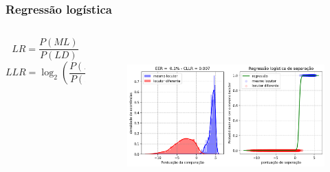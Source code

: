 \documentclass[121pt, aspectratio=169, t]{beamer}
\begin{document}
\begin{frame}[fragile=singleslide]
	\frametitle{Regressão logística}
	\begin{columns}
		\begin{column}{0.25\textwidth}
			\[LR = \frac{P(ML)}{P(LD)} \]
			\[LLR = \log_2 \left(\frac{P(ML)}{P(LD)} \right)\]
		\end{column}
		\begin{column}{0.75\textwidth}  %
			\vspace{-1.0cm}
			\begin{figure}
				\centering
				\includegraphics[height=6cm]{SMF_Logistic.png}
			\end{figure}
		\end{column}
	\end{columns}

\end{frame}
\end{document}
